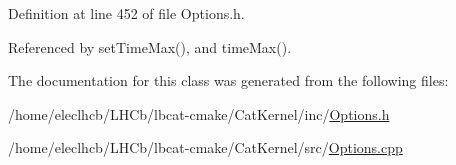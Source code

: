 Definition at line 452 of file Options.h.

Referenced by setTimeMax(), and timeMax().

The documentation for this class was generated from the following files:\begin{DoxyCompactItemize}
\item 
/home/eleclhcb/LHCb/lbcat-\/cmake/CatKernel/inc/\hyperlink{Options_8h}{Options.h}\item 
/home/eleclhcb/LHCb/lbcat-\/cmake/CatKernel/src/\hyperlink{Options_8cpp}{Options.cpp}\end{DoxyCompactItemize}
